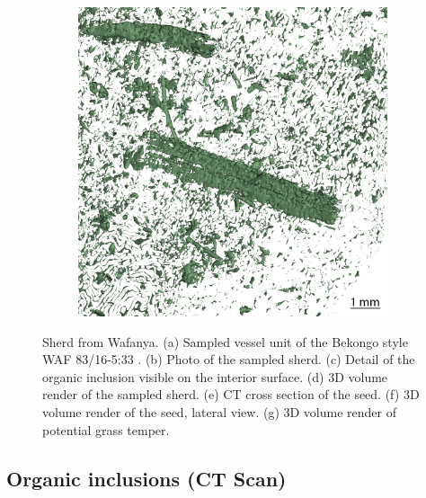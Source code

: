\documentclass[preprint,10pt,oneside,onecolumn,authoryear]{elsarticle}
\begin{document}
\begin{figure}[!p]
\begin{subfigure}[t]{.32\textwidth}
		\caption{}
		\label{fig:waf83/16-3:33_scan2}
	\end{subfigure}\hspace{.5em}\hfill
	\begin{subfigure}[t]{.32\textwidth}
		\includegraphics[width=\textwidth]{Fig_microCT_Screenshot2.jpg}
		\caption{}
		\label{fig:waf83/16-3:33_scan4}
	\end{subfigure}\hfill
	\caption{Sherd from Wafanya. (a) Sampled vessel unit of the Bekongo style WAF 83/16-5:33 \citep[503 Pl. 69.5]{Wotzka.1995}. (b) Photo of the sampled sherd. (c) Detail of the organic inclusion visible on the interior surface. (d) 3D volume render of the sampled sherd. (e) {\textmu}CT cross section of the seed. (f) 3D volume render of the seed, lateral view. (g) 3D volume render of potential grass temper.}
	\label{fig:waf83/16-3:33_microCT}
\end{figure}

\subsection{Organic inclusions ({\textmu}CT Scan)}
\end{document}
